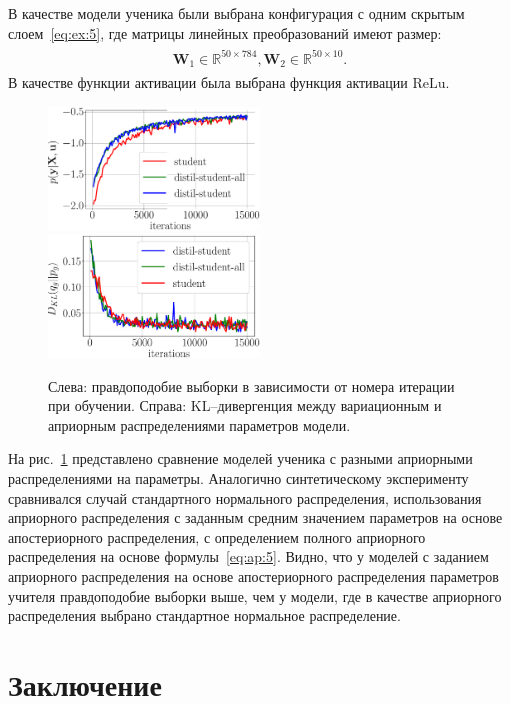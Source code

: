 \documentclass[12pt]{a&t}
\begin{document}
В качестве модели ученика были выбрана конфигурация с одним скрытым слоем~\eqref{eq:ex:5}, где матрицы линейных преобразований имеют размер:
\begin{gather}
\label{eq:ex:7}
\begin{aligned}
\mathbf{W}_{1} \in \mathbb{R}^{50 \times 784}, \mathbf{W}_{2} \in \mathbb{R}^{50 \times 10}.
\end{aligned}
\end{gather}
В качестве функции активации была выбрана функция активации $\text{ReLu}$.

\begin{figure}[h!]
\includegraphics[width=0.5\textwidth]{fashionmnist_likelihood_2_layers.eps}
\includegraphics[width=0.5\textwidth]{fashionmnist_D_KL_2_layers.eps}
\caption{Слева: правдоподобие выборки в зависимости от номера итерации при обучении. Справа: KL--дивергенция между вариационным и априорным распределениями параметров модели.}
\label{exp:fig3}
\end{figure}

На рис.~\ref{exp:fig3} представлено сравнение моделей ученика с разными априорными распределениями на параметры. Аналогично синтетическому эксперименту сравнивался случай стандартного нормального распределения, использования априорного распределения с заданным средним значением параметров на основе апостериорного распределения, с определением полного априорного распределения на основе формулы~\eqref{eq:ap:5}. Видно, что у моделей с заданием априорного распределения на основе апостериорного распределения параметров учителя правдоподобие выборки выше, чем у модели, где в качестве априорного распределения выбрано стандартное нормальное распределение.

\section{Заключение}
\end{document}
